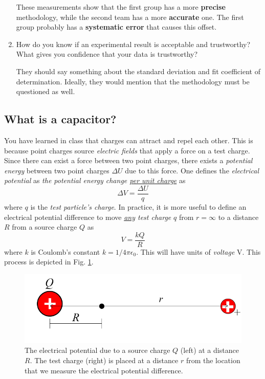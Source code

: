 \documentclass[12pt]{report}
\begin{document}
\begin{enumerate}
\begin{tcolorbox}[title=Answer]
These measurements show that the first group has a more \textbf{precise} methodology, while the second team has a more \textbf{accurate} one. The first group probably has a \textbf{systematic error} that causes this offset.
\end{tcolorbox}
\item How do you know if an experimental result is acceptable and trustworthy? What gives you confidence that your data is trustworthy?
\begin{tcolorbox}[title=Answer]
They should say something about the standard deviation and fit coefficient of determination. Ideally, they would mention that the methodology must be questioned as well.
\end{tcolorbox}
\end{enumerate}

\subsection{What is a capacitor?}
You have learned in class that charges can attract and repel each other. This is because point charges source \textit{electric fields} that apply a force on a test charge. Since there can exist a force between two point charges, there exists a \textit{potential energy} between two point charges $\Delta U$ due to this force. One defines the \textit{electrical potential} as \textit{the potential energy change \underline{per unit charge}} as
\begin{equation}
\Delta V = \frac{\Delta U}{q}
\label{Eq:ElectricPotential}
\end{equation}
where $q$ is the \textit{test particle's charge}. In practice, it is more useful to define an electrical potential difference to move \textit{\underline{any} test charge} $q$ from $r=\infty$ to a distance $R$ from a source charge $Q$ as
\begin{equation}
V = \frac{k Q}{R}
\label{Eq:ElectricPotential_point}
\end{equation}
where $k$ is Coulomb's constant $k = {1}/{4\pi \epsilon_0}$. This will have units of \textit{voltage} V. This process is depicted in Fig. \ref{Fig:ElectricPotential_point}.
\begin{figure}[h]
\centering
\includegraphics[width=0.7 \textwidth]{lab1-electric-potential.png}
\caption{The electrical potential due to a source charge $Q$ (left) at a distance $R$. The test charge (right) is placed at a distance $r$ from the location that we measure the electrical potential difference.}
\label{Fig:ElectricPotential_point}
\end{figure}
\end{document}
